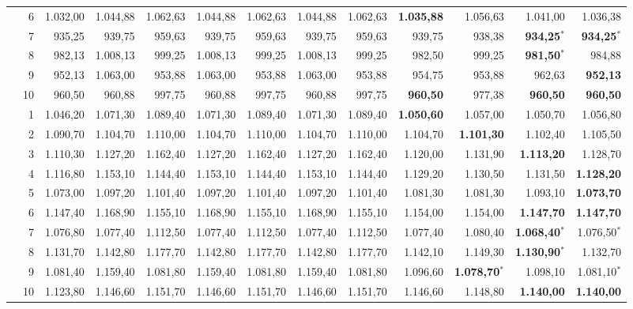 \documentclass[11pt,a4paper]{article}
\begin{document}
\begin{table}[!htbp]
{\begin{tabular}{rrr rr rr rr rr rr}
 & 6 & 1.032{,}00 & 1.044{,}88 & 1.062{,}63 & 1.044{,}88 & 1.062{,}63 & 1.044{,}88 & 1.062{,}63 & \textbf{1.035{,}88} & 1.056{,}63 & 1.041{,}00 & 1.036{,}38 \\
 & 7 & 935{,}25 & 939{,}75 & 959{,}63 & 939{,}75 & 959{,}63 & 939{,}75 & 959{,}63 & 939{,}75 & 938{,}38 & \textbf{934{,}25}$^{*}$ & \textbf{934{,}25}$^{*}$ \\
 & 8 & 982{,}13 & 1.008{,}13 & 999{,}25 & 1.008{,}13 & 999{,}25 & 1.008{,}13 & 999{,}25 & 982{,}50 & 999{,}25 & \textbf{981{,}50}$^{*}$ & 984{,}88 \\
 & 9 & 952{,}13 & 1.063{,}00 & 953{,}88 & 1.063{,}00 & 953{,}88 & 1.063{,}00 & 953{,}88 & 954{,}75 & 953{,}88 & 962{,}63 & \textbf{952{,}13} \\
 & 10 & 960{,}50 & 960{,}88 & 997{,}75 & 960{,}88 & 997{,}75 & 960{,}88 & 997{,}75 & \textbf{960{,}50} & 977{,}38 & \textbf{960{,}50} & \textbf{960{,}50} \\
\addlinespace
100 & 1 & 1.046{,}20 & 1.071{,}30 & 1.089{,}40 & 1.071{,}30 & 1.089{,}40 & 1.071{,}30 & 1.089{,}40 & \textbf{1.050{,}60} & 1.057{,}00 & 1.050{,}70 & 1.056{,}80 \\
 & 2 & 1.090{,}70 & 1.104{,}70 & 1.110{,}00 & 1.104{,}70 & 1.110{,}00 & 1.104{,}70 & 1.110{,}00 & 1.104{,}70 & \textbf{1.101{,}30} & 1.102{,}40 & 1.105{,}50 \\
 & 3 & 1.110{,}30 & 1.127{,}20 & 1.162{,}40 & 1.127{,}20 & 1.162{,}40 & 1.127{,}20 & 1.162{,}40 & 1.120{,}00 & 1.131{,}90 & \textbf{1.113{,}20} & 1.128{,}70 \\
 & 4 & 1.116{,}80 & 1.153{,}10 & 1.144{,}40 & 1.153{,}10 & 1.144{,}40 & 1.153{,}10 & 1.144{,}40 & 1.129{,}20 & 1.130{,}50 & 1.131{,}50 & \textbf{1.128{,}20} \\
 & 5 & 1.073{,}00 & 1.097{,}20 & 1.101{,}40 & 1.097{,}20 & 1.101{,}40 & 1.097{,}20 & 1.101{,}40 & 1.081{,}30 & 1.081{,}30 & 1.093{,}10 & \textbf{1.073{,}70} \\
 & 6 & 1.147{,}40 & 1.168{,}90 & 1.155{,}10 & 1.168{,}90 & 1.155{,}10 & 1.168{,}90 & 1.155{,}10 & 1.154{,}00 & 1.154{,}00 & \textbf{1.147{,}70} & \textbf{1.147{,}70} \\
 & 7 & 1.076{,}80 & 1.077{,}40 & 1.112{,}50 & 1.077{,}40 & 1.112{,}50 & 1.077{,}40 & 1.112{,}50 & 1.077{,}40 & 1.080{,}40 & \textbf{1.068{,}40}$^{*}$ & 1.076{,}50$^{*}$ \\
 & 8 & 1.131{,}70 & 1.142{,}80 & 1.177{,}70 & 1.142{,}80 & 1.177{,}70 & 1.142{,}80 & 1.177{,}70 & 1.142{,}10 & 1.149{,}30 & \textbf{1.130{,}90}$^{*}$ & 1.132{,}70 \\
 & 9 & 1.081{,}40 & 1.159{,}40 & 1.081{,}80 & 1.159{,}40 & 1.081{,}80 & 1.159{,}40 & 1.081{,}80 & 1.096{,}60 & \textbf{1.078{,}70}$^{*}$ & 1.098{,}10 & 1.081{,}10$^{*}$ \\
 & 10 & 1.123{,}80 & 1.146{,}60 & 1.151{,}70 & 1.146{,}60 & 1.151{,}70 & 1.146{,}60 & 1.151{,}70 & 1.146{,}60 & 1.148{,}80 & \textbf{1.140{,}00} & \textbf{1.140{,}00} \\
\bottomrule
\end{tabular}%
}
\end{table}
\end{document}
